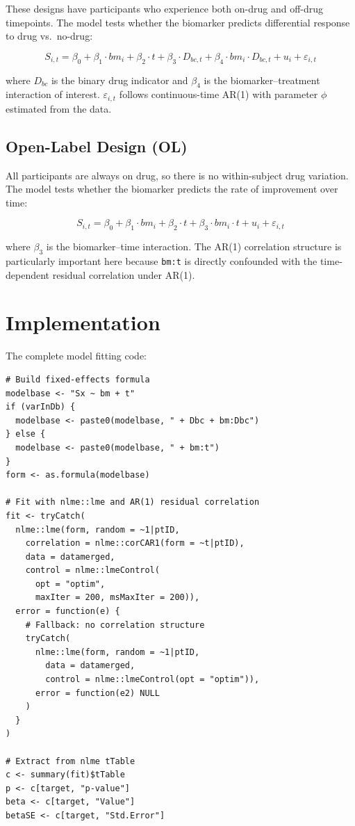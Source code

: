 \documentclass[11pt]{article}
\begin{document}
These designs have participants who experience both on-drug
and off-drug timepoints. The model tests whether the
biomarker predicts differential response to drug vs.\
no-drug:

\begin{equation}
S_{i,t} = \beta_0 + \beta_1 \cdot bm_i + \beta_2 \cdot t +
\beta_3 \cdot D_{bc,t} +
\beta_4 \cdot bm_i \cdot D_{bc,t} + u_i +
\varepsilon_{i,t}
\label{eq:varInDb}
\end{equation}

where $D_{bc}$ is the binary drug indicator and $\beta_4$ is
the biomarker--treatment interaction of interest.
$\varepsilon_{i,t}$ follows continuous-time AR(1) with
parameter $\phi$ estimated from the data.

\subsection{Open-Label Design (OL)}

All participants are always on drug, so there is no
within-subject drug variation. The model tests whether the
biomarker predicts the rate of improvement over time:

\begin{equation}
S_{i,t} = \beta_0 + \beta_1 \cdot bm_i + \beta_2 \cdot t +
\beta_3 \cdot bm_i \cdot t + u_i + \varepsilon_{i,t}
\label{eq:OL}
\end{equation}

where $\beta_3$ is the biomarker--time interaction. The AR(1)
correlation structure is particularly important here because
\texttt{bm:t} is directly confounded with the time-dependent
residual correlation under AR(1).

\section{Implementation}

The complete model fitting code:

\begin{verbatim}
# Build fixed-effects formula
modelbase <- "Sx ~ bm + t"
if (varInDb) {
  modelbase <- paste0(modelbase, " + Dbc + bm:Dbc")
} else {
  modelbase <- paste0(modelbase, " + bm:t")
}
form <- as.formula(modelbase)

# Fit with nlme::lme and AR(1) residual correlation
fit <- tryCatch(
  nlme::lme(form, random = ~1|ptID,
    correlation = nlme::corCAR1(form = ~t|ptID),
    data = datamerged,
    control = nlme::lmeControl(
      opt = "optim",
      maxIter = 200, msMaxIter = 200)),
  error = function(e) {
    # Fallback: no correlation structure
    tryCatch(
      nlme::lme(form, random = ~1|ptID,
        data = datamerged,
        control = nlme::lmeControl(opt = "optim")),
      error = function(e2) NULL
    )
  }
)

# Extract from nlme tTable
c <- summary(fit)$tTable
p <- c[target, "p-value"]
beta <- c[target, "Value"]
betaSE <- c[target, "Std.Error"]
\end{verbatim}
\end{document}
